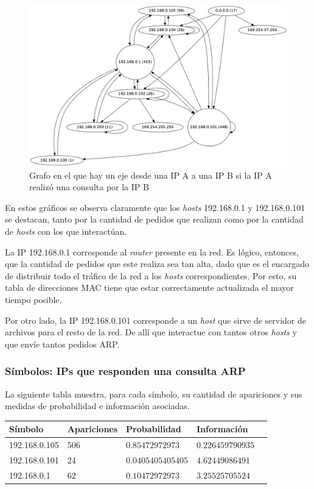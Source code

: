 \documentclass{article}
\begin{document}
\begin{figure}[h!]
    \centering
    \includegraphics[width=350pt]{red1requestersgraph.png}
    \caption{Grafo en el que hay un eje desde una IP A a una IP B si la IP A
        realizó una consulta por la IP B}
    \label{fig:red1requesters:graph}
\end{figure}

En estos gráficos se observa claramente que los \emph{hosts} 192.168.0.1 y
192.168.0.101 se destacan, tanto por la cantidad de pedidos que realizan como
por la cantidad de \emph{hosts} con los que interactúan.

La IP 192.168.0.1 corresponde al \emph{router} presente en la red. Es lógico,
entonces, que la cantidad de pedidos que este realiza sea tan alta, dado que
es el encargado de distribuir todo el tráfico de la red a los \emph{hosts}
correspondientes. Por esto, su tabla de direcciones MAC tiene que estar
correctamente actualizada el mayor tiempo posible.

Por otro lado, la IP 192.168.0.101 corresponde a un \emph{host} que sirve de
servidor de archivos para el resto de la red. De allí que interactue con
tantos otros \emph{hosts} y que envíe tantos pedidos ARP.

\subsubsection{Símbolos: IPs que responden una consulta ARP}
La siguiente tabla muestra, para cada símbolo, su cantidad de apariciones y
sus medidas de probabilidad e información asociadas.

\vskip10pt

\begin{tabular}{|l|l|l|l|l|}
  \hline
  Símbolo & Apariciones & Probabilidad & Información \\
  \hline
  192.168.0.105 & 506 & $0.85472972973$ & $0.226459790935$ \\
  \hline
  192.168.0.101 & 24 & $0.0405405405405$ & $4.62449086491$ \\
  \hline
  192.168.0.1 & 62 & $0.10472972973$ & $3.25525705524$ \\
  \hline
\end{tabular}\\
\end{document}
